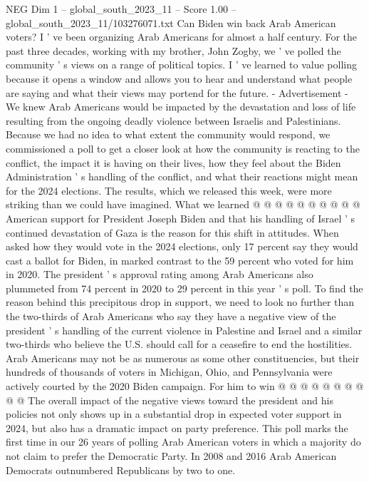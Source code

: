 \begin{textsample}{NEG Dim 1 – global\_south\_2023\_11 – Score 1.00 – global\_south\_2023\_11/103276071.txt}  \label{ex:f1_neg_327}
Can Biden win back Arab American voters?
I ' ve been organizing Arab Americans for almost a half century.
For the past three decades, working with my brother, John Zogby, we ' ve polled the community ' s views on a range of political topics.
I ' ve learned to value polling because it opens a window and allows you to hear and understand what people are saying and what their views may portend for the future. - Advertisement - We knew Arab Americans would be impacted by the devastation and loss of life resulting from the ongoing deadly violence between Israelis and Palestinians.
Because we had no idea to what extent the community would respond, we commissioned a poll to get a closer look at how the community is reacting to the conflict, the impact it is having on their lives, how they feel about the Biden Administration ' s handling of the conflict, and what their reactions might mean for the 2024 elections.
The results, which we released this week, were more striking than we could have imagined.
What we learned @ @ @ @ @ @ @ @ @ @ American support for President Joseph Biden and that his handling of Israel ' s continued devastation of Gaza is the reason for this shift in attitudes.
When asked how they would vote in the 2024 elections, only 17 percent say they would cast a ballot for Biden, in marked contrast to the 59 percent who voted for him in 2020.
The president ' s approval rating among Arab Americans also plummeted from 74 percent in 2020 to 29 percent in this year ' s poll.
To find the reason behind this precipitous drop in support, we need to look no further than the two-thirds of Arab Americans who say they have a negative view of the president ' s handling of the current violence in Palestine and Israel and a similar two-thirds who believe the U.S. should call for a ceasefire to end the hostilities.
Arab Americans may not be as numerous as some other constituencies, but their hundreds of thousands of voters in Michigan, Ohio, and Pennsylvania were actively courted by the 2020 Biden campaign.
For him to win @ @ @ @ @ @ @ @ @ @ The overall impact of the negative views toward the president and his policies not only shows up in a substantial drop in expected voter support in 2024, but also has a dramatic impact on party preference.
This poll marks the first time in our 26 years of polling Arab American voters in which a majority do not claim to prefer the Democratic Party.
In 2008 and 2016 Arab American Democrats outnumbered Republicans by two to one.

\end{textsample}
